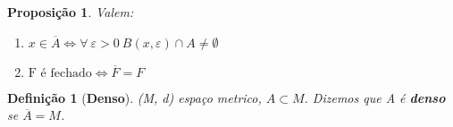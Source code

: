 \documentclass{article}
\newtheorem*{definition}{Definição}
\newtheorem*{proposicao}{Proposição}
\begin{document}
\begin{proposicao} Valem:
    \begin{enumerate}
        \item  $x \in \overline{A} \Leftrightarrow \forall \: \varepsilon > 0 \: B(x, \varepsilon) \cap A \neq \emptyset$
        \item $ \text{F é fechado} \Leftrightarrow \overline{F} = F$
    \end{enumerate}
\end{proposicao}

\begin{definition}[\textbf{Denso}]
    (M, d) espaço metrico, $A \subset M$. Dizemos que A é \textbf{denso} se $\overline{A} = M$.
\end{definition}
\end{document}
